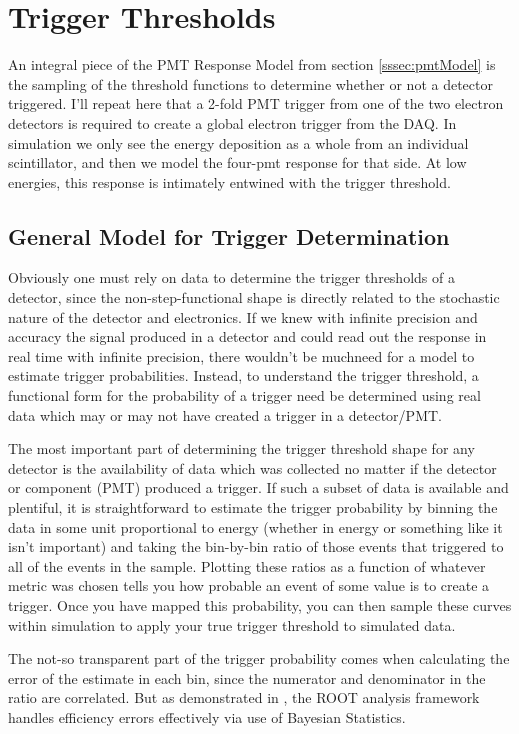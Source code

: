 \section{Trigger Thresholds}
An integral piece of the PMT Response Model from section \ref{sssec:pmtModel} 
is the sampling of the threshold functions to determine whether or not a detector
triggered. I'll repeat here that a 2-fold PMT trigger from one of the two electron
detectors is required to create a global electron trigger from the DAQ. In simulation
we only see the energy deposition as a whole from an individual scintillator, and then
we model the four-pmt response for that side. At low energies, this response is 
intimately entwined with the trigger threshold.

\subsection{General Model for Trigger Determination} \label{ssec:genTrigModel}
Obviously one must rely on data to determine the trigger thresholds of a detector, since
the non-step-functional shape is directly related to the stochastic nature 
of the detector and electronics. If we knew with infinite precision and 
accuracy the signal produced in a detector
and could read out the response in real time with infinite precision, 
there wouldn't be muchneed for a model to estimate trigger probabilities. 
Instead, to understand the trigger threshold, a functional 
form for the probability of a trigger need be determined using real data which may or 
may not have created a trigger in a detector/PMT. 

The most important part of determining the trigger threshold shape for 
any detector is the availability of data which was collected no matter if 
the detector or component (PMT) produced a trigger. If such a subset of 
data is available and plentiful, it is straightforward to estimate
the trigger probability by binning the data in some unit proportional to 
energy (whether in energy or something like it isn't important) and taking 
the bin-by-bin ratio of those events that triggered to all of the events in the 
sample. Plotting these ratios as a function of whatever metric was chosen tells 
you how probable an event of some value is to create a trigger.
Once you have mapped this probability, you can then sample these curves within 
simulation to apply your true trigger threshold to simulated data.

The not-so transparent part of the trigger probability comes when calculating the error of the estimate in each bin, since the numerator and denominator in the ratio are correlated. But as demonstrated in \cite{casadei2009efficiency}, the ROOT analysis framework handles efficiency errors effectively via use of Bayesian Statistics. 

